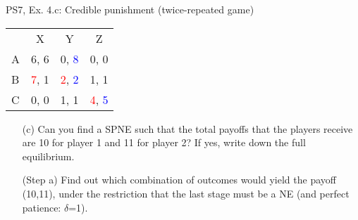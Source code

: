 \begin{frame}{PS7, Ex. 4.c: Credible punishment (twice-repeated game)}
    \vspace{-2pt}
    \begin{table}
      \begin{tabular}{l|c|c|c|}
        \multicolumn{1}{c}{} & \multicolumn{1}{c}{X} & \multicolumn{1}{c}{Y} & \multicolumn{1}{c}{Z}\\\cline{2-4}
        A   & 6, 6 &  0, \textcolor{blue}{8} &  0, 0  \\\cline{2-4}
        B & \textcolor{red}{7}, 1  & \textcolor{red}{2}, \textcolor{blue}{2} &  1, 1  \\\cline{2-4}
        C & 0, 0  & 1, 1 &  \textcolor{red}{4}, \textcolor{blue}{5}  \\\cline{2-4}
      \end{tabular}
    \end{table}
    \vspace{-4pt}
    \begin{itemize}
        \item[(c)] Can you find a SPNE such that the total payoffs that the players receive are 10 for player 1 and 11 for player 2? If yes, write down the full equilibrium.
    \end{itemize}
    \vspace{-8pt}
    \begin{multicols}{2}
      \begin{itemize}
        \item[(Step a)] Find out which combination of outcomes would yield the payoff (10,11), under the restriction that the last stage must be a NE (and perfect patience: $\delta$=1).
      \end{itemize}
      \vspace{-6pt}
      \vfill\null\columnbreak
      \vfill\null
    \end{multicols}
\end{frame}
